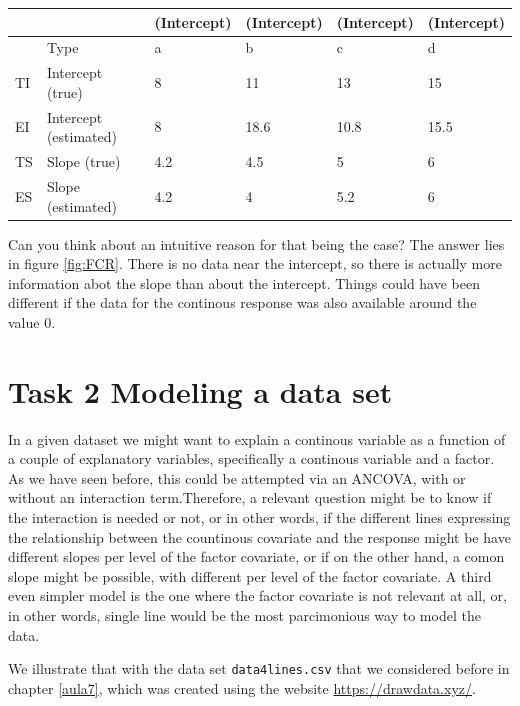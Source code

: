 \documentclass[
]{book}
\begin{document}
\begin{tabular}{l|l|l|l|l|l}
\hline
  &  & (Intercept) & (Intercept) & (Intercept) & (Intercept)\\
\hline
 & Type & a & b & c & d\\
\hline
TI & Intercept (true) & 8 & 11 & 13 & 15\\
\hline
EI & Intercept (estimated) & 8 & 18.6 & 10.8 & 15.5\\
\hline
TS & Slope (true) & 4.2 & 4.5 & 5 & 6\\
\hline
ES & Slope (estimated) & 4.2 & 4 & 5.2 & 6\\
\hline
\end{tabular}

Can you think about an intuitive reason for that being the case? The answer lies in figure \ref{fig:FCR}. There is no data near the intercept, so there is actually more information abot the slope than about the intercept. Things could have been different if the data for the continous response was also available around the value 0.

\hypertarget{task-2-modeling-a-data-set}{%
\section{Task 2 Modeling a data set}\label{task-2-modeling-a-data-set}}

In a given dataset we might want to explain a continous variable as a function of a couple of explanatory variables, specifically a continous variable and a factor. As we have seen before, this could be attempted via an ANCOVA, with or without an interaction term.Therefore, a relevant question might be to know if the interaction is needed or not, or in other words, if the different lines expressing the relationship between the countinous covariate and the response might be have different slopes per level of the factor covariate, or if on the other hand, a comon slope might be possible, with different per level of the factor covariate. A third even simpler model is the one where the factor covariate is not relevant at all, or, in other words, single line would be the most parcimonious way to model the data.

We illustrate that with the data set \texttt{data4lines.csv} that we considered before in chapter \ref{aula7}, which was created using the website \url{https://drawdata.xyz/}.
\end{document}
